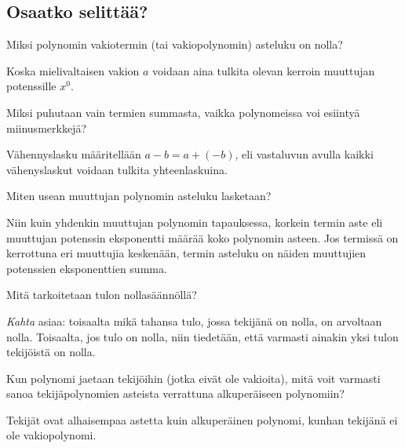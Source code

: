 \subsection*{Osaatko selittää?}

\begin{tehtava}
Miksi polynomin vakiotermin (tai vakiopolynomin) asteluku on nolla?
	\begin{vastaus}
	Koska mielivaltaisen vakion $a$ voidaan aina tulkita olevan kerroin muuttujan potenssille $x^0$.
	\end{vastaus}
\end{tehtava}

\begin{tehtava}
Miksi puhutaan vain termien summasta, vaikka polynomeissa voi esiintyä miinusmerkkejä?
	\begin{vastaus}
	Vähennyslasku määritellään $a-b=a+(-b)$, eli vastaluvun avulla kaikki vähenyslaskut voidaan tulkita yhteenlaskuina.
	\end{vastaus}
\end{tehtava}

\begin{tehtava}
Miten usean muuttujan polynomin asteluku lasketaan?
	\begin{vastaus}
	Niin kuin yhdenkin muuttujan polynomin tapauksessa, korkein termin aste eli muuttujan potenssin eksponentti määrää koko polynomin asteen. Jos termissä on kerrottuna eri muuttujia keskenään, termin asteluku on näiden muuttujien potenssien eksponenttien summa.
	\end{vastaus}
\end{tehtava}

\begin{tehtava}
Mitä tarkoitetaan tulon nollasäännöllä?
	\begin{vastaus}
\textit{Kahta} asiaa: toisaalta mikä tahansa tulo, jossa tekijänä on nolla, on arvoltaan nolla. Toisaalta, jos tulo on nolla, niin tiedetään, että varmasti ainakin yksi tulon tekijöistä on nolla.
	\end{vastaus}
\end{tehtava}

\begin{tehtava}
Kun polynomi jaetaan tekijöihin (jotka eivät ole vakioita), mitä voit varmasti sanoa tekijäpolynomien asteista verrattuna alkuperäiseen polynomiin?
	\begin{vastaus}
Tekijät ovat alhaisempaa astetta kuin alkuperäinen polynomi, kunhan tekijänä ei ole vakiopolynomi.
	\end{vastaus}
\end{tehtava}

